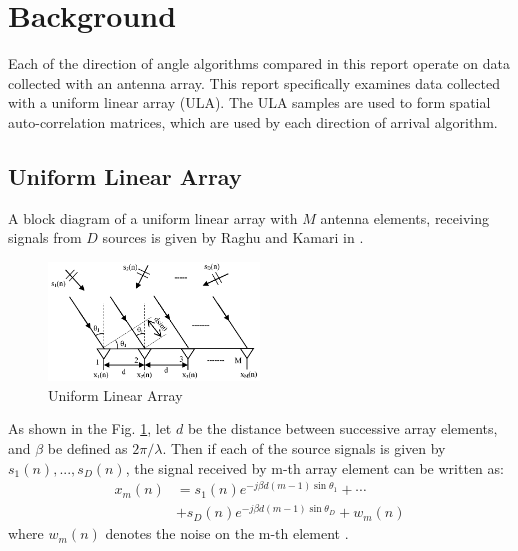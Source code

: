 \documentclass[conference]{IEEEtran}
\begin{document}
	\section{Background}
	
	Each of the direction of angle algorithms compared in this report operate on data collected with an antenna array. This report specifically examines data collected with a uniform linear array (ULA). The ULA samples are used to form spatial auto-correlation matrices, which are used by each direction of arrival algorithm.
	
	\subsection{Uniform Linear Array}
	
	A block diagram of a uniform linear array with $M$ antenna elements, receiving signals from $D$ sources is given by Raghu and Kamari in \cite{doa_algorithms_raghu}.
	
	\begin{figure}
		\centerline{\includegraphics[width=0.5\textwidth]{uniform_linear_array.png}}
		\caption{Uniform Linear Array \cite{doa_algorithms_raghu}}
		\label{fig::uniform_linear_array}
	\end{figure}
	
	As shown in the Fig. \ref{fig::uniform_linear_array}, let $d$ be the distance between successive array elements, and $\beta$ be defined as $2\pi/\lambda$. Then if each of the source signals is given by $s_1(n),...,s_D(n)$, the signal received by m-th array element can be written as:
	\begin{equation}
		\label{received_signal}
		\begin{split}
			x_m(n) &= s_1(n)e^{-j{\beta}d(m-1)\sin{\theta_1}} + \cdots\\
			&+ s_D(n)e^{-j{\beta}d(m-1)\sin{\theta_D}} + w_m(n)
		\end{split}
	\end{equation}
	where $w_m(n)$ denotes the noise on the m-th element \cite{doa_algorithms_raghu}.
	
\end{document}
